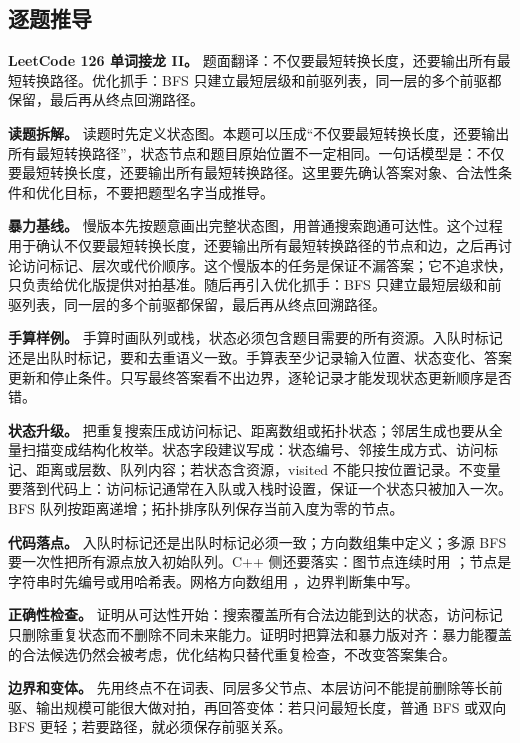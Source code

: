 \subsection{逐题推导}

\noindent\textbf{LeetCode 126 单词接龙 II。} 题面翻译：不仅要最短转换长度，还要输出所有最短转换路径。优化抓手：BFS 只建立最短层级和前驱列表，同一层的多个前驱都保留，最后再从终点回溯路径。

\textbf{读题拆解。} 读题时先定义状态图。本题可以压成“不仅要最短转换长度，还要输出所有最短转换路径”，状态节点和题目原始位置不一定相同。一句话模型是：不仅要最短转换长度，还要输出所有最短转换路径。这里要先确认答案对象、合法性条件和优化目标，不要把题型名字当成推导。

\textbf{暴力基线。} 慢版本先按题意画出完整状态图，用普通搜索跑通可达性。这个过程用于确认不仅要最短转换长度，还要输出所有最短转换路径的节点和边，之后再讨论访问标记、层次或代价顺序。这个慢版本的任务是保证不漏答案；它不追求快，只负责给优化版提供对拍基准。随后再引入优化抓手：BFS 只建立最短层级和前驱列表，同一层的多个前驱都保留，最后再从终点回溯路径。

\textbf{手算样例。} 手算时画队列或栈，状态必须包含题目需要的所有资源。入队时标记还是出队时标记，要和去重语义一致。手算表至少记录输入位置、状态变化、答案更新和停止条件。只写最终答案看不出边界，逐轮记录才能发现状态更新顺序是否错。

\textbf{状态升级。} 把重复搜索压成访问标记、距离数组或拓扑状态；邻居生成也要从全量扫描变成结构化枚举。状态字段建议写成：状态编号、邻接生成方式、访问标记、距离或层数、队列内容；若状态含资源，visited 不能只按位置记录。不变量要落到代码上：访问标记通常在入队或入栈时设置，保证一个状态只被加入一次。BFS 队列按距离递增；拓扑排序队列保存当前入度为零的节点。

\textbf{代码落点。} 入队时标记还是出队时标记必须一致；方向数组集中定义；多源 BFS 要一次性把所有源点放入初始队列。C++ 侧还要落实：图节点连续时用 ；节点是字符串时先编号或用哈希表。网格方向数组用 ，边界判断集中写。

\textbf{正确性检查。} 证明从可达性开始：搜索覆盖所有合法边能到达的状态，访问标记只删除重复状态而不删除不同未来能力。证明时把算法和暴力版对齐：暴力能覆盖的合法候选仍然会被考虑，优化结构只替代重复检查，不改变答案集合。

\textbf{边界和变体。} 先用终点不在词表、同层多父节点、本层访问不能提前删除等长前驱、输出规模可能很大做对拍，再回答变体：若只问最短长度，普通 BFS 或双向 BFS 更轻；若要路径，就必须保存前驱关系。

